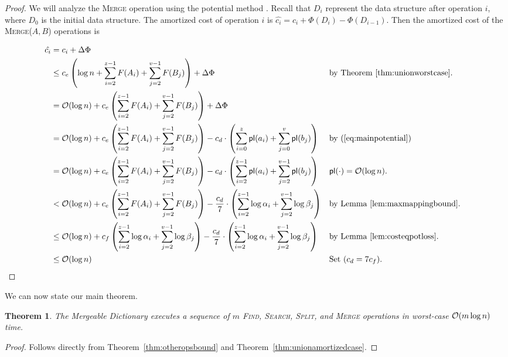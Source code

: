 \documentclass[11pt]{article}
\newcommand{\ens}[1]{\ensuremath{#1}}
\newcommand{\Ds}{Mergeable Dictionary}
\newcommand{\kwMs}{Make-Set}
\newcommand{\kwSpl}{Split}
\newcommand{\kwUnion}{Merge}
\newcommand{\kwSrc}{Search}
\newcommand{\kwFind}{Find}
\newcommand{\Ms}{\mbox{\textsc{\kwMs}}}
\newcommand{\Spl}{\mbox{\textsc{\kwSpl}}}
\newcommand{\Union}{\mbox{\textsc{\kwUnion{}}}}
\newcommand{\Unionx}[2]{\mbox{\textsc{\kwUnion(\ensuremath{#1,#2})}}}
\newcommand{\Src}{\mbox{\textsc{\kwSrc}}}
\newcommand{\Find}{\mbox{\textsc{\kwFind}}}
\newcommand{\cons}[1]{\ensuremath{c_{#1}}}
\newcommand{\cnsd}{\cons d}
\newcommand{\cnse}{\cons e}
\newcommand{\cnsf}{\cons f}
\newcommand{\lasta}{z}
\newcommand{\lastb}{v}
\newcommand{\intl}[1]{\ensuremath{#1}}
\newcommand{\agap}[1]{\ensuremath{a_{#1}}}
\newcommand{\bgap}[1]{\ensuremath{b_{#1}}}
\newcommand{\intfun}[1]{\ensuremath{F(\intl #1)}}
\newcommand{\potlossa}[1]{\ens{\mathsf{pl}(\agap{#1})}}
\newcommand{\potlossb}[1]{\ens{\mathsf{pl}(\bgap{#1})}}
\newcommand{\maxpotlossa}[1]{\ensuremath{\alpha_{#1}}}
\newcommand{\maxpotlossb}[1]{\ensuremath{\beta_{#1}}}
\newcommand{\datast}[1]{\ensuremath{D_{#1}}}
\newcommand{\hide}[1]{}
\newcommand{\potfun}[1]{\ensuremath{\Phi(#1)}}
\newcommand{\amcost}[1]{\ensuremath{\hat{c_{#1}}}}
\newcommand{\actcost}[1]{\ensuremath{c_{#1}}}
\newcounter{count}
\newtheorem{thm}[count]{Theorem}
\begin{document}
\begin{proof} 
We will analyze the \Union{} operation using the potential method \cite{amortizedcomplexity}. Recall that \datast i represent the data structure after operation $i$, where $D_0$ is the initial data structure. The amortized cost of operation $i$ is $\amcost i = \actcost i + \potfun{\datast i} - \potfun{\datast{i-1}}$. Then the amortized cost of the \Unionx{A}{B} operations is 


{\allowdisplaybreaks
\begin{align*} 
\amcost i &= \actcost i + \Delta\Phi \\ 
&\leq \cnse\left(\log n +\sum_{i=2}^{\lasta-1} \intfun{A_i} + \sum_{j=2}^{\lastb-1} \intfun{B_j}\right)+ \Delta\Phi&&\mbox{by Theorem~\ref{thm:unionworstcase}.}\\ 
&=\mathcal O(\log n) + \cnse\left(\sum_{i=2}^{\lasta-1} \intfun{A_i} + \sum_{j=2}^{\lastb-1} \intfun{B_j}\right)+ \Delta\Phi\\ 
&=\mathcal O(\log n) + \cnse\left(\sum_{i=2}^{\lasta-1} \intfun{A_i} + \sum_{j=2}^{\lastb-1} \intfun{B_j}\right)- \cnsd\cdot\left(\sum_{i=0}^{\lasta} \potlossa{i} + \sum_{j=0}^{\lastb} \potlossb{j}\right)&&\mbox{by (\ref{eq:mainpotential})}\\
&=\mathcal O(\log n) + \cnse\left(\sum_{i=2}^{\lasta-1} \intfun{A_i} + \sum_{j=2}^{\lastb-1} \intfun{B_j}\right)- \cnsd\cdot\left(\sum_{i=2}^{\lasta-1} \potlossa{i} + \sum_{j=2}^{\lastb-1} \potlossb{j}\right)&& \mbox{$\mathsf{pl}(\cdot)={\cal O}(\log n).$ }\\ 
&<\mathcal O(\log n) + \cnse\left(\sum_{i=2}^{\lasta-1} \intfun{A_i} + \sum_{j=2}^{\lastb-1} \intfun{B_j}\right)- \frac{\cnsd}{7}\cdot\left(\sum_{i=2}^{\lasta-1} \log\maxpotlossa i + \sum_{j=2}^{\lastb-1} \log\maxpotlossb j\right)&& \mbox{by Lemma~\ref{lem:maxmappingbound}.}\\ 
&\leq\mathcal O(\log n) + \cnsf\left(\sum_{i=2}^{\lasta-1} \log\maxpotlossa i + \sum_{j=2}^{\lastb-1} \log\maxpotlossb j\right)- \frac{\cnsd}{7}\cdot\left(\sum_{i=2}^{\lasta-1} \log\maxpotlossa i + \sum_{j=2}^{\lastb-1} \log\maxpotlossb j\right)&& \mbox{by Lemma~\ref{lem:costeqpotloss}.}\\ 
&\leq\mathcal O(\log n) && \mbox{Set ($\cnsd = 7\cnsf$).} 
\end{align*}}
\end{proof} 
We can now state our main theorem. 

\begin{thm} 
\label{thm:maintheorem} 
The \Ds{} executes a sequence of $m$ \hide{\Ms{}, }\Find{}, \Src{}, \Spl{}, and \Union{} operations \hide{, $n$ of which are \Ms{} operations, }in worst-case ${\cal O}(m\log n)$ time. 
\end{thm} 

\begin{proof} 
Follows directly from Theorem~\ref{thm:otheropsbound} and Theorem~\ref{thm:unionamortizedcase}. 
\end{proof} 






\end{document}
